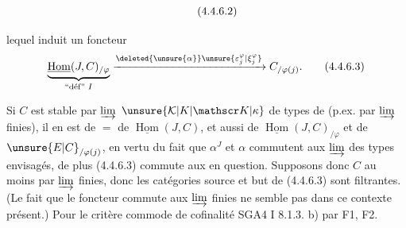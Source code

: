 \[\tag*{(4.4.6.2)}\vphantom{C}\]

lequel induit un foncteur
\[
\underbrace{\underline{\operatorname{Hom}}(J,C)_{/\varphi}}_{\text{``déf'' }I}
\xrightarrow{\deleted{\unsure{\alpha}}\unsure{\varepsilon_j^{\varphi}|\xi_j^{\varphi}}}
C_{/\varphi(j)}.\tag*{(4.4.6.3)}
\]

Si $C$ est stable par $\varinjlim$    $\unsure{\mathcal K|K|\mathscr K|\kappa}$ de types de   (p.ex. par $\varinjlim$ finies), il en est de $=$ de $\underline{\operatorname{Hom}}(J,C)$, et aussi de $\underline{\operatorname{Hom}}(J,C)_{/\varphi}$ et de $\unsure{E|C}_{/\varphi(j)}$, en vertu du fait que $\alpha^J$ et $\alpha$ commutent aux $\varinjlim$ des types envisagés, de plus (4.4.6.3) commute aux   en question. Supposons donc $C$   au moins par $\varinjlim$ finies, donc  les catégories source et but de (4.4.6.3) sont filtrantes. (Le fait que le foncteur commute aux $\varinjlim$ finies ne semble pas  dans ce contexte présent.)   Pour  le critère commode de cofinalité SGA4 I 8.1.3. b) par \deleted{$\unsure{\varphi}$}F1, \deleted{$\unsure{\varphi}$}F2.
